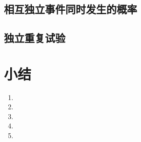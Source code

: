 \subsection{相互独立事件同时发生的概率}
\begin{Practice}
  \begin{question}
    \item 
    \item 
    \item 
    \item 
  \end{question}
\end{Practice}

\subsection{独立重复试验}
\begin{Practice}
  \begin{question}
    \item 
    \item 
  \end{question}
\end{Practice}

\begin{Exercise}
  \begin{question}
    \item 
    \item 
    \item 
    \item 
    \item 
    \item 
    \item 
    \item 
    \item 
    \item 
    \item 
    \item 
    \item 
    \item 
  \end{question}
\end{Exercise}

\section*{小结}
\begin{enumerate}[C、,itemindent=4.5em]
  \item 
  \item 
  \item 
  \item 
  \item 
\end{enumerate}
